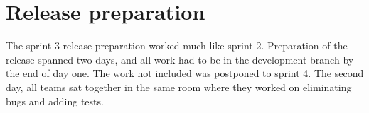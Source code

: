 \section{Release preparation}

The sprint 3 release preparation worked much like sprint 2. Preparation of the release spanned two days, and all work had to be in the development branch by the end of day one. The work not included was postponed to sprint 4. The second day, all teams sat together in the same room where they worked on eliminating bugs and adding tests.

